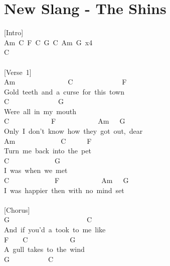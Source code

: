 \documentclass[]{book}
\let\stdsection\section
\renewcommand\section{\clearpage\stdsection}
\begin{document}
\hypertarget{new-slang---the-shins}{%
\section{New Slang - The Shins}\label{new-slang---the-shins}}

{[}Intro{]}\\
Am~C~F~C~G~C~Am~G~x4\\
C\\
~\\
{[}Verse~1{]}\\
Am~~~~~~~~~~~~~~~C~~~~~~~~~~~~~~F\\
Gold~teeth~and~a~curse~for~this~town\\
C~~~~~~~~~~~~~~G\\
Were~all~in~my~mouth\\
\hspace*{0.333em}\hspace*{0.333em}\hspace*{0.333em}\hspace*{0.333em}\hspace*{0.333em}C~~~~~~~~~~~~F~~~~~~~~~~~~Am~~~G\\
Only~I~don't~know~how~they~got~out,~dear\\
Am~~~~~~~~~~~~~C~~~~~~F\\
Turn~me~back~into~the~pet\\
C~~~~~~~~~~~~~G\\
I~was~when~we~met\\
C~~~~~~~~~~~~~F~~~~~~~~~~~~Am~~~G\\
I~was~happier~then~with~no~mind~set\\
~\\
{[}Chorus{]}\\
G~~~~~~~~~~~~~~~~~~~~~~C\\
And~if~you'd~a~took~to~me~like\\
\hspace*{0.333em}\hspace*{0.333em}F~~~~C~~~~~~~~~~~~G\\
A~gull~takes~to~the~wind\\
\hspace*{0.333em}\hspace*{0.333em}\hspace*{0.333em}\hspace*{0.333em}\hspace*{0.333em}\hspace*{0.333em}\hspace*{0.333em}\hspace*{0.333em}\hspace*{0.333em}\hspace*{0.333em}\hspace*{0.333em}\hspace*{0.333em}G~~~~~~~~~~~C\\
\end{document}
